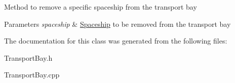 Method to remove a specific spaceship from the transport bay 
\begin{DoxyParams}{Parameters}
{\em spaceship} & \hyperlink{classSpaceship}{Spaceship} to be removed from the transport bay \\
\hline
\end{DoxyParams}


The documentation for this class was generated from the following files\+:\begin{DoxyCompactItemize}
\item 
Transport\+Bay.\+h\item 
Transport\+Bay.\+cpp\end{DoxyCompactItemize}
